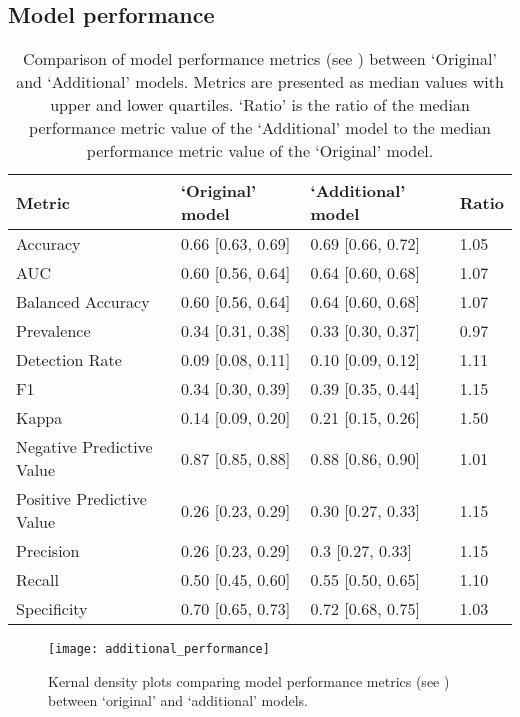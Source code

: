 \subsection{Model performance}

\begin{table}[h]
\centering
\caption[Comparison of model performance metrics]{Comparison of model performance metrics (see ) between `Original' and `Additional' models. Metrics are presented as median values with upper and lower quartiles. `Ratio' is the ratio of the median performance metric value of the `Additional' model to the median performance metric value of the `Original' model.}
\begin{tabular}{P{4.5cm}P{3cm}P{3.15cm}P{1.5cm}}
  \hline
Metric & `Original' model & `Additional' model & Ratio\\
  \hline
  Accuracy & 0.66 [0.63, 0.69] & 0.69 [0.66, 0.72] & 1.05 \\ 
  AUC & 0.60 [0.56, 0.64] & 0.64 [0.60, 0.68] & 1.07 \\ 
  Balanced Accuracy & 0.60 [0.56, 0.64] & 0.64 [0.60, 0.68] & 1.07 \\ 
  Prevalence & 0.34 [0.31, 0.38] & 0.33 [0.30, 0.37] & 0.97 \\ 
  Detection Rate & 0.09 [0.08, 0.11] & 0.10 [0.09, 0.12] & 1.11 \\ 
  F1 & 0.34 [0.30, 0.39] & 0.39 [0.35, 0.44] & 1.15 \\ 
  Kappa & 0.14 [0.09, 0.20] & 0.21 [0.15, 0.26] & 1.50 \\ 
  Negative Predictive Value & 0.87 [0.85, 0.88] & 0.88 [0.86, 0.90] & 1.01 \\ 
  Positive Predictive Value & 0.26 [0.23, 0.29] & 0.30 [0.27, 0.33] & 1.15 \\ 
  Precision & 0.26 [0.23, 0.29] & 0.3 [0.27, 0.33] & 1.15 \\ 
  Recall & 0.50 [0.45, 0.60] & 0.55 [0.50, 0.65] & 1.10 \\ 
  Specificity & 0.70 [0.65, 0.73] & 0.72 [0.68, 0.75] & 1.03 \\ 
   \hline
\end{tabular}
\label{tab:additional-retained-variables}
\end{table}

\begin{figure}[h]
    \centering
    \texttt{[image: additional\_performance]}
    \caption[Kernal density plots comparing model performance metrics]{Kernal density plots comparing model performance metrics (see ) between `original' and `additional' models. }
    \label{fig:additional-performance}
\end{figure}

